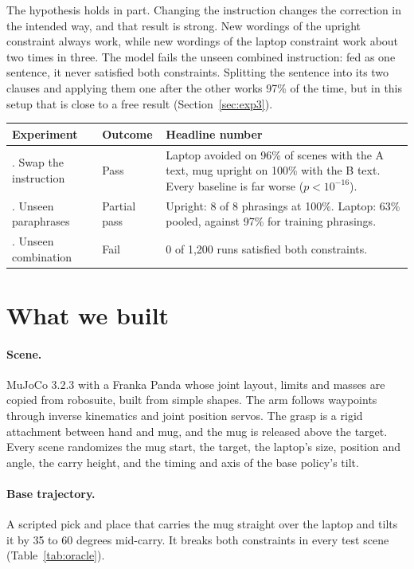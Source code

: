 \documentclass[11pt]{article}
\begin{document}
The hypothesis holds in part. Changing the instruction changes the correction in the intended
way, and that result is strong. New wordings of the upright constraint always work, while new
wordings of the laptop constraint work about two times in three. The model fails the unseen
combined instruction: fed as one sentence, it never satisfied both constraints. Splitting the
sentence into its two clauses and applying them one after the other works 97\% of the time, but
in this setup that is close to a free result (Section~\ref{sec:exp3}).

\begin{center}
\small
\begin{tabularx}{\linewidth}{@{}>{\raggedright\arraybackslash}p{3.4cm}p{2.2cm}Y@{}}
\toprule
Experiment & Outcome & Headline number \\
. Swap the instruction & Pass & Laptop avoided on 96\% of scenes with the A text, mug upright on
100\% with the B text. Every baseline is far worse ($p<10^{-16}$). \\
2. Unseen paraphrases & Partial pass & Upright: 8 of 8 phrasings at 100\%. Laptop: 63\% pooled,
against 97\% for training phrasings. \\
3. Unseen combination & Fail & 0 of 1{,}200 runs satisfied both constraints. \\
\bottomrule
\end{tabularx}
\end{center}

\section{What we built}

\paragraph{Scene.} MuJoCo 3.2.3 with a Franka Panda whose joint layout, limits and masses are
copied from robosuite, built from simple shapes. The arm follows waypoints through inverse
kinematics and joint position servos. The grasp is a rigid attachment between hand and mug, and
the mug is released above the target. Every scene randomizes the mug start, the target, the
laptop's size, position and angle, the carry height, and the timing and axis of the base
policy's tilt.

\paragraph{Base trajectory.} A scripted pick and place that carries the mug straight over the
laptop and tilts it by 35 to 60 degrees mid-carry. It breaks both constraints in every test scene
(Table~\ref{tab:oracle}).
\end{document}
